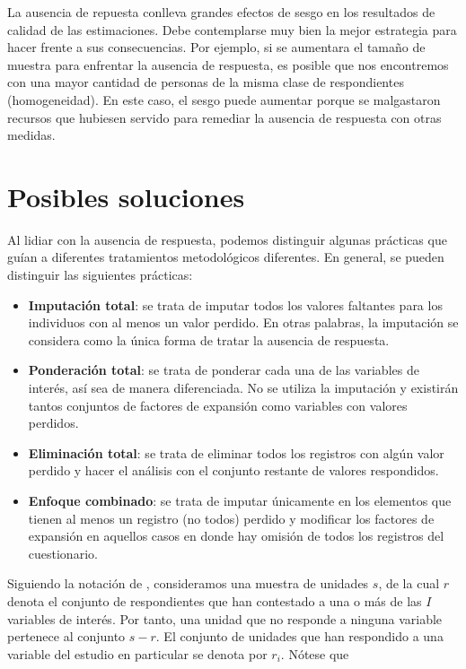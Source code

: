 \documentclass[
  12pt,
]{book}
\providecommand{\tightlist}{%
  \setlength{\itemsep}{0pt}\setlength{\parskip}{0pt}}
\begin{document}
La ausencia de repuesta conlleva grandes efectos de sesgo en los resultados de calidad de las estimaciones. Debe contemplarse muy bien la mejor estrategia para hacer frente a sus consecuencias. Por ejemplo, si se aumentara el tamaño de muestra para enfrentar la ausencia de respuesta, es posible que nos encontremos con una mayor cantidad de personas de la misma clase de respondientes (homogeneidad). En este caso, el sesgo puede aumentar porque se malgastaron recursos que hubiesen servido para remediar la ausencia de respuesta con otras medidas.

\hypertarget{posibles-soluciones}{%
\section{Posibles soluciones}\label{posibles-soluciones}}

Al lidiar con la ausencia de respuesta, podemos distinguir algunas prácticas que guían a diferentes tratamientos metodológicos diferentes. En general, se pueden distinguir las siguientes prácticas:

\begin{itemize}
\tightlist
\item
  \textbf{Imputación total}: se trata de imputar todos los valores faltantes para los individuos con al menos un valor perdido. En otras palabras, la imputación se considera como la única forma de tratar la ausencia de respuesta.
\item
  \textbf{Ponderación total}: se trata de ponderar cada una de las variables de interés, así sea de manera diferenciada. No se utiliza la imputación y existirán tantos conjuntos de factores de expansión como variables con valores perdidos.
\item
  \textbf{Eliminación total}: se trata de eliminar todos los registros con algún valor perdido y hacer el análisis con el conjunto restante de valores respondidos.
\item
  \textbf{Enfoque combinado}: se trata de imputar únicamente en los elementos que tienen al menos un registro (no todos) perdido y modificar los factores de expansión en aquellos casos en donde hay omisión de todos los registros del cuestionario.
\end{itemize}

Siguiendo la notación de \citet{Sarndal_Lundstrom_2006}, consideramos una muestra de unidades \(s\), de la cual \(r\) denota el conjunto de respondientes que han contestado a una o más de las \(I\) variables de interés. Por tanto, una unidad que no responde a ninguna variable pertenece al conjunto \(s-r\). El conjunto de unidades que han respondido a una variable del estudio en particular se denota por \(r_i\). Nótese que
\end{document}
